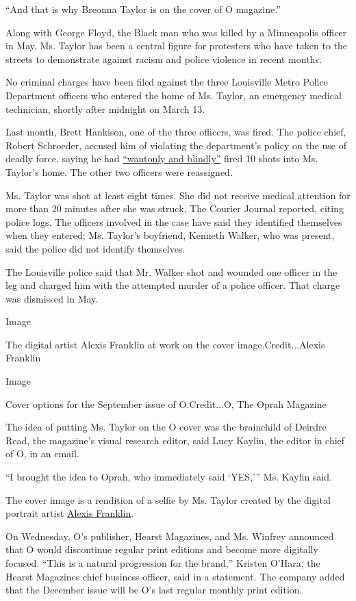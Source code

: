 ``And that is why Breonna Taylor is on the cover of O magazine.''

Along with George Floyd, the Black man who was killed by a Minneapolis
officer in May, Ms. Taylor has been a central figure for protesters who
have taken to the streets to demonstrate against racism and police
violence in recent months.

No criminal charges have been filed against the three Louisville Metro
Police Department officers who entered the home of Ms. Taylor, an
emergency medical technician, shortly after midnight on March 13.

Last month, Brett Hankison, one of the three officers, was fired. The
police chief, Robert Schroeder, accused him of violating the
department's policy on the use of deadly force, saying he had
\href{https://www.nytimes3xbfgragh.onion/2020/06/23/us/breonna-taylor-brett-hankison-fired.html}{``wantonly
and blindly''} fired 10 shots into Ms. Taylor's home. The other two
officers were reassigned.

Ms. Taylor was shot at least eight times. She did not receive medical
attention for more than 20 minutes after she was struck, The Courier
Journal reported, citing police logs. The officers involved in the case
have said they identified themselves when they entered; Ms. Taylor's
boyfriend, Kenneth Walker, who was present, said the police did not
identify themselves.

The Louisville police said that Mr. Walker shot and wounded one officer
in the leg and charged him with the attempted murder of a police
officer. That charge was dismissed in May.

Image

The digital artist Alexis Franklin at work on the cover
image.Credit...Alexis Franklin

Image

Cover options for the September issue of O.Credit...O, The Oprah
Magazine

The idea of putting Ms. Taylor on the O cover was the brainchild of
Deirdre Read, the magazine's visual research editor, said Lucy Kaylin,
the editor in chief of O, in an email.

``I brought the idea to Oprah, who immediately said `YES,''' Ms. Kaylin
said.

The cover image is a rendition of a selfie by Ms. Taylor created by the
digital portrait artist
\href{https://www.oprahmag.com/life/a33449982/oprah-breonna-taylor/}{Alexis
Franklin}.

On Wednesday, O's publisher, Hearst Magazines, and Ms. Winfrey announced
that O would discontinue regular print editions and become more
digitally focused. ``This is a natural progression for the brand,''
Kristen O'Hara, the Hearst Magazines chief business officer, said in a
statement. The company added that the December issue will be O's last
regular monthly print edition.

